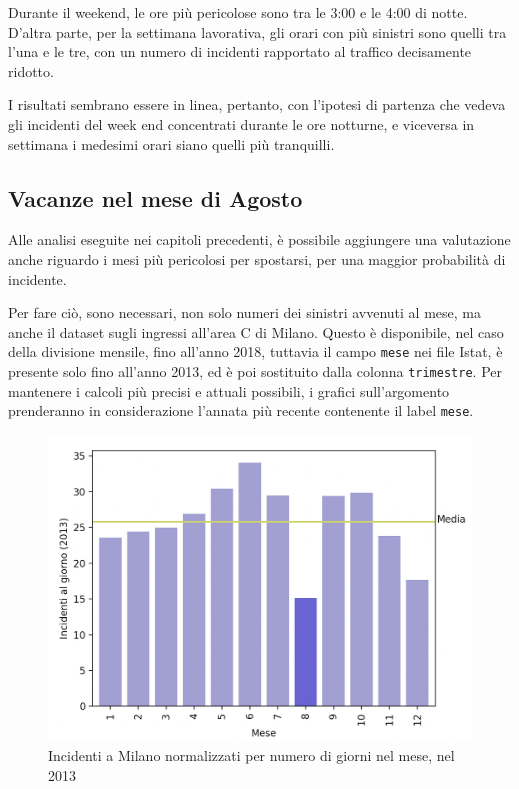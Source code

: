 \documentclass[a4paper]{report}
\newcommand{\columnstyle}[1]{\texttt{#1}}
\begin{document}
Durante il weekend, le ore più pericolose sono tra le 3:00 e le 4:00 di notte. 
D'altra parte, per la settimana lavorativa, gli orari con più sinistri sono quelli 
tra l'una e le tre, con un numero di incidenti rapportato al 
traffico decisamente ridotto. 

I risultati sembrano essere 
in linea, pertanto, con l'ipotesi di partenza che vedeva gli incidenti del week 
end concentrati durante le ore notturne, e viceversa in settimana i medesimi orari 
siano quelli più tranquilli.


\subsection{Vacanze nel mese di Agosto}

Alle analisi eseguite nei capitoli precedenti, 
è possibile aggiungere una valutazione anche riguardo i mesi più pericolosi per spostarsi, 
per una maggior probabilità di incidente.

Per fare ciò, sono necessari, non solo numeri dei sinistri avvenuti al mese, 
ma anche il dataset sugli ingressi all'area C di Milano. 
Questo è disponibile, nel caso della divisione 
mensile, fino all'anno 2018, tuttavia il campo \columnstyle{mese} nei file Istat, è 
presente solo fino all'anno 2013, ed è poi sostituito 
dalla colonna \columnstyle{trimestre}. 
Per mantenere i calcoli più precisi e attuali possibili, i grafici sull'argomento prenderanno 
in considerazione l'annata più recente contenente il label \columnstyle{mese}. 

\begin{figure}
    \hfill\includegraphics[width=0.7\linewidth]{../src/incidenti/incidenti_senza_coords/mese_incidenti/milano_mese.png}\hspace*{\fill}
    \caption{Incidenti a Milano normalizzati per numero di giorni nel mese, nel 2013}
    \label{fig:milano-mese}
\end{figure}
\end{document}
